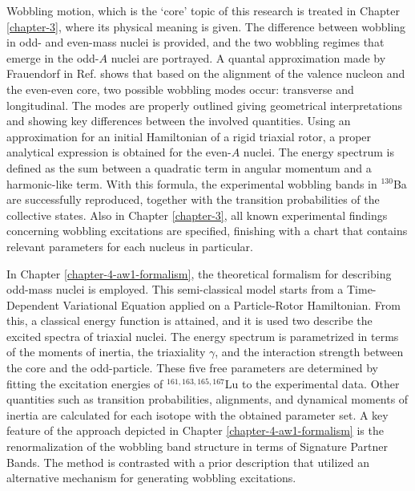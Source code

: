 Wobbling motion, which is the `core' topic of this research is treated in Chapter \ref{chapter-3}, where its physical meaning is given. The difference between wobbling in odd- and even-mass nuclei is provided, and the two wobbling regimes that emerge in the odd-$A$ nuclei are portrayed. A quantal approximation made by Frauendorf in Ref. \cite{frauendorf2014transverse} shows that based on the alignment of the valence nucleon and the even-even core, two possible wobbling modes occur: transverse and longitudinal. The modes are properly outlined giving geometrical interpretations and showing key differences between the involved quantities. Using an approximation for an initial Hamiltonian of a rigid triaxial rotor, a proper analytical expression is obtained for the even-$A$ nuclei. The energy spectrum is defined as the sum between a quadratic term in angular momentum and a harmonic-like term. With this formula, the experimental wobbling bands in $^{130}$Ba are successfully reproduced, together with the transition probabilities of the collective states. Also in Chapter \ref{chapter-3}, all known experimental findings concerning wobbling excitations are specified, finishing with a chart that contains relevant parameters for each nucleus in particular. 

In Chapter \ref{chapter-4-aw1-formalism}, the theoretical formalism for describing odd-mass nuclei is employed. This semi-classical model starts from a Time-Dependent Variational Equation applied on a Particle-Rotor Hamiltonian. From this, a classical energy function is attained, and it is used two describe the excited spectra of triaxial nuclei. The energy spectrum is parametrized in terms of the moments of inertia, the triaxiality $\gamma$, and the interaction strength between the core and the odd-particle. These five free parameters are determined by fitting the excitation energies of $^{161,163,165,167}$Lu to the experimental data. Other quantities such as transition probabilities, alignments, and dynamical moments of inertia are calculated for each isotope with the obtained parameter set. A key feature of the approach depicted in Chapter \ref{chapter-4-aw1-formalism} is the renormalization of the wobbling band structure in terms of Signature Partner Bands. The method is contrasted with a prior description that utilized an alternative mechanism for generating wobbling excitations.

